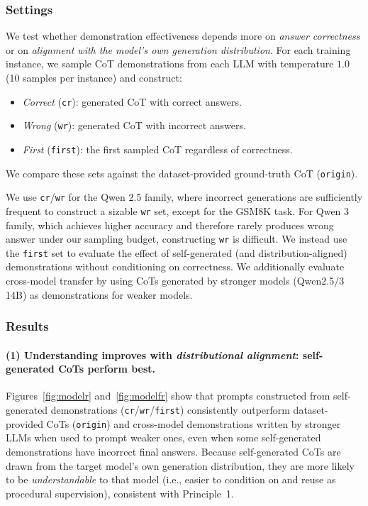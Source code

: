 \subsubsection{Settings} 

We test whether demonstration effectiveness depends more on \emph{answer correctness} or on \emph{alignment with the model's own generation distribution}.
For each training instance, we sample CoT demonstrations from each LLM with temperature $1.0$ (10 samples per instance) and construct:




\begin{itemize}
    \vspace{-2mm}
    \setlength{\itemsep}{1pt}    %
    \setlength{\parsep}{1pt}     %
    \setlength{\parskip}{1pt}    %
    \item \emph{Correct} (\texttt{cr}): generated CoT with correct answers.
    \item \emph{Wrong} (\texttt{wr}): generated CoT with incorrect answers.
    \item \emph{First} (\texttt{first}): the first sampled CoT regardless of correctness.
    \vspace{-2mm}
\end{itemize}

We compare these sets against the dataset-provided ground-truth CoT (\texttt{origin}).

We use \texttt{cr}/\texttt{wr} for the Qwen 2.5 family, where incorrect generations are sufficiently frequent to construct a sizable \texttt{wr} set, except for the GSM8K task.
For Qwen 3 family, which achieves higher accuracy and therefore rarely produces wrong answer under our sampling budget, constructing \texttt{wr} is difficult. We instead use the \texttt{first} set to evaluate the effect of self-generated (and distribution-aligned) demonstrations without conditioning on correctness. We additionally evaluate cross-model transfer by using CoTs generated by stronger models (Qwen2.5/3 14B) as demonstrations for weaker models.


\subsubsection{Results} 


\paragraph{(1) Understanding improves with \emph{distributional alignment}: self-generated CoTs perform best.}
Figures~\ref{fig:modelr} and~\ref{fig:modelfr} show that prompts constructed from self-generated demonstrations (\texttt{cr}/\texttt{wr}/\texttt{first}) consistently outperform dataset-provided CoTs (\texttt{origin}) and cross-model demonstrations written by stronger LLMs when used to prompt weaker ones, even when some self-generated demonstrations have incorrect final answers.
Because self-generated CoTs are drawn from the target model's own generation distribution, they are more likely to be \emph{understandable} to that model (i.e., easier to condition on and reuse as procedural supervision), consistent with Principle~1.

